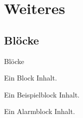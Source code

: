 \documentclass[student]{ihfBeamer} %
\begin{document}
\section{Weiteres}
\contentframe
\subsection{Blöcke}

\begin{frame}{Blöcke}
\begin{block}{Ein Block}
\alert<2>{Inhalt.}\\
\end{block}

\begin{exampleblock}{Ein Beispielblock}
Inhalt.
\end{exampleblock}

\begin{alertblock}{Ein Alarmblock}
Inhalt.
\end{alertblock}

\end{frame}
\end{document}
